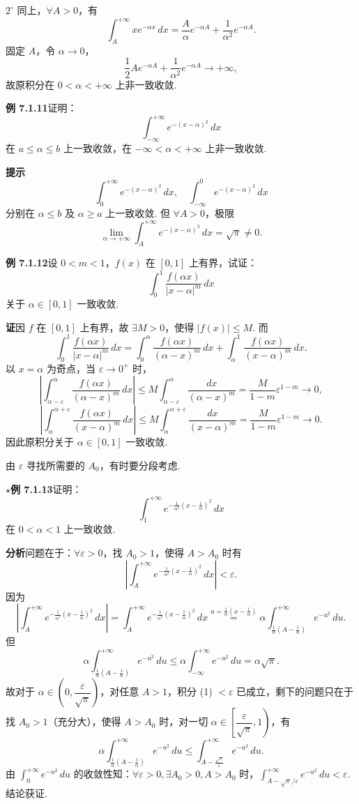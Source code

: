 \documentclass[UTF8, 12pt, fontset=fandol, oneside]{ctexart}
\begin{document}
$2^\circ$ 同上，$\forall A>0$，有
\[
\int_A^{+\infty}xe^{-\alpha x}\,dx
=\frac{A}{\alpha}e^{-\alpha A}+\frac1{\alpha^2}e^{-\alpha A}.
\]
固定 $A$，令 $\alpha\to0$，
\[
\frac12Ae^{-\alpha A}+\frac1{\alpha^2}e^{-\alpha A}\to+\infty,
\]
故原积分在 $0<\alpha<+\infty$ 上非一致收敛.

\noindent\textbf{例 7.1.11}\quad 证明：
\[
\int_{-\infty}^{+\infty}e^{-(x-\alpha)^2}\,dx
\]
在 $a\le\alpha\le b$ 上一致收敛，在 $-\infty<\alpha<+\infty$ 上非一致收敛.

\noindent\textbf{提示}\quad
\[
\int_0^{+\infty}e^{-(x-\alpha)^2}\,dx,\quad
\int_{-\infty}^0e^{-(x-\alpha)^2}\,dx
\]
分别在 $\alpha\le b$ 及 $\alpha\ge a$ 上一致收敛. 但 $\forall A>0$，极限
\[
\lim_{\alpha\to+\infty}\int_A^{+\infty}e^{-(x-\alpha)^2}\,dx=\sqrt\pi\ne0.
\]

\noindent\textbf{例 7.1.12}\quad 设 $0<m<1$，$f(x)$ 在 $[0,1]$ 上有界，试证：
\[
\int_0^1\frac{f(\alpha x)}{|x-\alpha|^m}\,dx
\]
关于 $\alpha\in[0,1]$ 一致收敛.

\noindent\textbf{证}\quad 因 $f$ 在 $[0,1]$ 上有界，故 $\exists M>0$，使得 $|f(x)|\le M$. 而
\[
\int_0^1\frac{f(\alpha x)}{|x-\alpha|^m}\,dx
=\int_0^\alpha\frac{f(\alpha x)}{(\alpha-x)^m}\,dx
+\int_\alpha^1\frac{f(\alpha x)}{(x-\alpha)^m}\,dx.
\]
以 $x=\alpha$ 为奇点，当 $\varepsilon\to0^+$ 时，
\[
\left|\int_{\alpha-\varepsilon}^{\alpha}\frac{f(\alpha x)}{(\alpha-x)^m}\,dx\right|
\le M\int_{\alpha-\varepsilon}^{\alpha}\frac{dx}{(\alpha-x)^m}
=\frac{M}{1-m}\varepsilon^{1-m}\to0,
\]
\[
\left|\int_{\alpha}^{\alpha+\varepsilon}\frac{f(\alpha x)}{(x-\alpha)^m}\,dx\right|
\le M\int_{\alpha}^{\alpha+\varepsilon}\frac{dx}{(x-\alpha)^m}
=\frac{M}{1-m}\varepsilon^{1-m}\to0.
\]
因此原积分关于 $\alpha\in[0,1]$ 一致收敛.

由 $\varepsilon$ 寻找所需要的 $A_0$，有时要分段考虑.

\noindent\textbf{$\star$例 7.1.13}\quad 证明：
\[
\int_1^{+\infty}e^{-\frac1{\alpha^2}\left(x-\frac1\alpha\right)^2}\,dx
\]
在 $0<\alpha<1$ 上一致收敛.

\noindent\textbf{分析}\quad 问题在于：$\forall\varepsilon>0$，找 $A_0>1$，使得 $A>A_0$ 时有
\[
\left|\int_A^{+\infty}e^{-\frac1{\alpha^2}\left(x-\frac1\alpha\right)^2}\,dx\right|<\varepsilon.
\]
因为
\[
\left|\int_A^{+\infty}e^{-\frac1{\alpha^2}\left(x-\frac1\alpha\right)^2}\,dx\right|
=\int_A^{+\infty}e^{-\frac1{\alpha^2}\left(x-\frac1\alpha\right)^2}\,dx
\stackrel{u=\frac1\alpha(x-\frac1\alpha)}{=}
\alpha\int_{\frac1\alpha(A-\frac1\alpha)}^{+\infty}e^{-u^2}\,du.
\tag{1}
\]
但
\[
\alpha\int_{\frac1\alpha(A-\frac1\alpha)}^{+\infty}e^{-u^2}\,du
\le \alpha\int_{-\infty}^{+\infty}e^{-u^2}\,du
=\alpha\sqrt\pi.
\]
故对于 $\alpha\in\left(0,\dfrac{\varepsilon}{\sqrt\pi}\right)$，对任意 $A>1$，积分 (1) $<\varepsilon$ 已成立，剩下的问题只在于找 $A_0>1$（充分大），使得 $A>A_0$ 时，对一切 $\alpha\in\left[\dfrac{\varepsilon}{\sqrt\pi},1\right)$，有
\[
\alpha\int_{\frac1\alpha(A-\frac1\alpha)}^{+\infty}e^{-u^2}\,du
\le\int_{A-\frac{\sqrt\pi}{\varepsilon}}^{+\infty}e^{-u^2}\,du.
\tag{2}
\]
由 $\displaystyle\int_0^{+\infty}e^{-u^2}\,du$ 的收敛性知：$\forall\varepsilon>0,\exists A_0>0,A>A_0$ 时，$\displaystyle\int_{A-\sqrt\pi/\varepsilon}^{+\infty}e^{-u^2}\,du<\varepsilon$. 结论获证.
\end{document}
